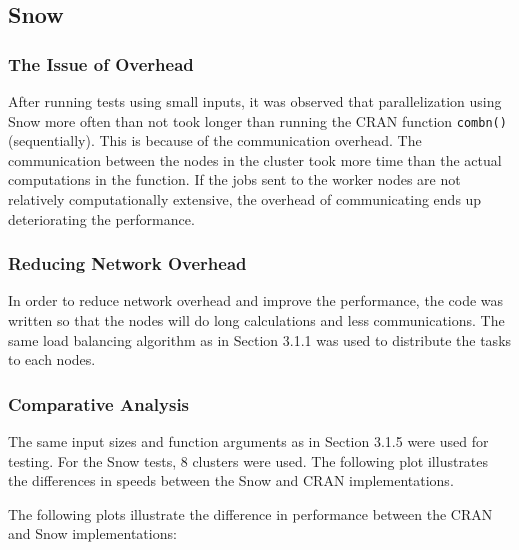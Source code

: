 \subsection{Snow}

\subsubsection{The Issue of Overhead}
After running tests using small inputs, it was observed that parallelization using Snow more often than not took longer than running the CRAN function \texttt{combn()} (sequentially). This is because of the communication overhead. The communication between the nodes in the cluster took more time than the actual computations in the function. If the jobs sent to the worker nodes are not relatively computationally extensive, the overhead of communicating ends up deteriorating the performance.

\subsubsection{Reducing Network Overhead}
In order to reduce network overhead and improve the performance, the code was written so that the nodes will do long calculations and less communications. The same load balancing algorithm as in Section 3.1.1 was used to distribute the tasks to each nodes.

\subsubsection{Comparative Analysis}
The same input sizes and function arguments as in Section 3.1.5 were used for testing. For the Snow tests, 8 clusters were used. The following plot illustrates the differences in speeds between the Snow and CRAN implementations.\\
\null

The following plots illustrate the difference in performance between the CRAN and Snow implementations:\\






